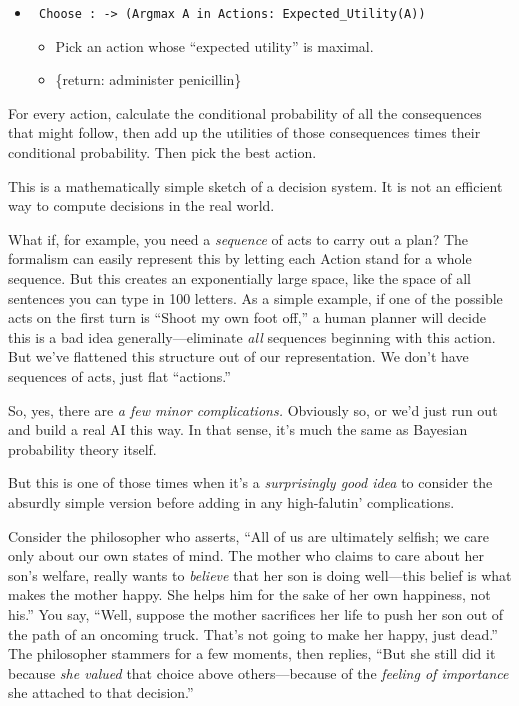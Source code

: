 {\begin{itemize}
\item \texttt{ Choose :\newline
  -{\textgreater} (Argmax A in Actions: Expected\_Utility(A))}
  \begin{itemize}
  \item  Pick an action whose ``expected utility'' is maximal.
  \item \{return: administer penicillin\}
  \end{itemize}
\end{itemize}

{
 For every action, calculate the conditional probability of all the
consequences that might follow, then add up the utilities of those
consequences times their conditional probability. Then pick the best
action.}

{
 This is a mathematically simple sketch of a decision system. It is
not an efficient way to compute decisions in the real world.}

{
 What if, for example, you need a \textit{sequence} of acts to
carry out a plan? The formalism can easily represent this by letting
each Action stand for a whole sequence. But this creates an
exponentially large space, like the space of all sentences you can type
in 100 letters. As a simple example, if one of the possible acts on the
first turn is ``Shoot my own foot
off,'' a human planner will decide this is a bad idea
generally---eliminate \textit{all} sequences beginning with this
action. But we've flattened this structure out of our
representation. We don't have sequences of acts, just
flat ``actions.''}

{
 So, yes, there are \textit{a few minor complications.} Obviously
so, or we'd just run out and build a real AI this way.
In that sense, it's much the same as Bayesian
probability theory itself.}

{
 But this is one of those times when it's a
\textit{surprisingly good idea} to consider the absurdly simple version
before adding in any high-falutin' complications.}

{
 Consider the philosopher who asserts, ``All of us
are ultimately selfish; we care only about our own states of mind. The
mother who claims to care about her son's welfare,
really wants to \textit{believe} that her son is doing well---this
belief is what makes the mother happy. She helps him for the sake of
her own happiness, not his.'' You say,
``Well, suppose the mother sacrifices her life to push
her son out of the path of an oncoming truck. That's
not going to make her happy, just dead.'' The
philosopher stammers for a few moments, then replies,
``But she still did it because \textit{she valued}
that choice above others---because of the \textit{feeling of
importance} she attached to that decision.''}

}

